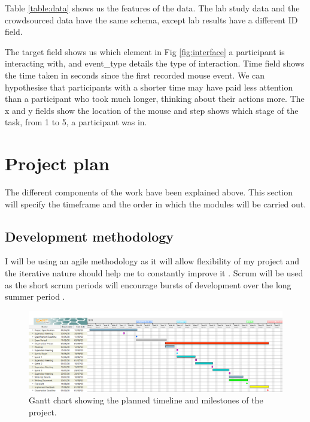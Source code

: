 \documentclass{article}
\begin{document}
Table \ref{table:data} shows us the features of the data.
The lab study data and the crowdsourced data have the same schema, except lab results have a different ID field.

The target field shows us which element in Fig \ref{fig:interface} a participant is interacting with, and event\_type details the type of interaction.
Time field shows the time taken in seconds since the first recorded mouse event.
We can hypothesise that participants with a shorter time may have paid less attention than a participant who took much longer, thinking about their actions more.
The x and y fields show the location of the mouse and step shows which stage of the task, from 1 to 5, a participant was in.


\section{Project plan}
% 

The different components of the work have been explained above.
This section will specify the timeframe and the order in which the modules will be carried out.

\subsection{Development methodology}



I will be using an agile methodology as it will allow flexibility of my project and the iterative nature should help me to constantly improve it \cite{beck2001manifesto}. 
Scrum will be used as the short scrum periods will encourage bursts of development over the long summer period \cite{schwaber1997scrum}.

\begin{figure}[ht]
    \centering
    \centerline{
        \includegraphics[scale=0.32]{GanttChart.PNG}
    }
    \caption{Gantt chart showing the planned timeline and milestones of the project.}
    \label{fig:Gantt}
\end{figure}
\end{document}
